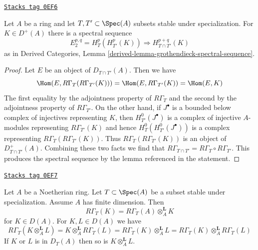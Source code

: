 \begin{lemma}
\label{local-cohomology-lemma-local-cohomology-ss}
\href{https://stacks.math.columbia.edu/tag/0EF6}{\texttt{Stacks tag 0EF6}}

Let $A$ be a ring and let $T, T' \subset \Spec(A)$ subsets
stable under specialization. For $K \in D^+(A)$
there is a spectral sequence
$$
E_2^{p, q} = H^p_T(H^p_{T'}(K)) \Rightarrow H^{p + q}_{T \cap T'}(K)
$$
as in Derived Categories, Lemma
\ref{derived-lemma-grothendieck-spectral-sequence}.
\end{lemma}

\begin{proof}
Let $E$ be an object of $D_{T \cap T'}(A)$. Then we have
$$
\Hom(E, R\Gamma_T(R\Gamma_{T'}(K))) =
\Hom(E, R\Gamma_{T'}(K)) =
\Hom(E, K)
$$
The first equality by the adjointness property of $R\Gamma_T$
and the second by the adjointness property of $R\Gamma_{T'}$.
On the other hand, if $J^\bullet$ is a bounded below complex
of injectives representing $K$, then $H^0_{T'}(J^\bullet)$
is a complex of injective $A$-modules representing $R\Gamma_{T'}(K)$
and hence $H^0_T(H^0_{T'}(J^\bullet))$ is a complex representing
$R\Gamma_T(R\Gamma_{T'}(K))$. Thus $R\Gamma_T(R\Gamma_{T'}(K))$
is an object of $D^+_{T \cap T'}(A)$. Combining these two
facts we find that $R\Gamma_{T \cap T'} = R\Gamma_T \circ R\Gamma_{T'}$.
This produces the spectral sequence by the lemma referenced
in the statement.
\end{proof}

\begin{lemma}
\label{local-cohomology-lemma-torsion-tensor-product}
\href{https://stacks.math.columbia.edu/tag/0EF7}{\texttt{Stacks tag 0EF7}}

Let $A$ be a Noetherian ring. Let $T \subset \Spec(A)$ be a subset
stable under specialization. Assume $A$ has finite dimension. Then
$$
R\Gamma_T(K) = R\Gamma_T(A) \otimes_A^\mathbf{L} K
$$
for $K \in D(A)$. For $K, L \in D(A)$ we have
$$
R\Gamma_T(K \otimes_A^\mathbf{L} L) =
K \otimes_A^\mathbf{L} R\Gamma_T(L) =
R\Gamma_T(K) \otimes_A^\mathbf{L} L =
R\Gamma_T(K) \otimes_A^\mathbf{L} R\Gamma_T(L)
$$
If $K$ or $L$ is in $D_T(A)$ then so is $K \otimes_A^\mathbf{L} L$.
\end{lemma}

